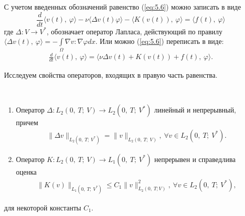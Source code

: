 С учетом введенных обозначений равенство (\ref{eq:5.6}) можно записать в виде
$$\frac{d}{dt} \langle v(t), \ \varphi \rangle - \nu\langle \Delta v(t) \varphi \rangle -
\langle K(v(t)), \ \varphi \rangle = \langle f(t), \ \varphi \rangle $$
где $\Delta: V \rightarrow V^\ast$, обозначает оператор Лапласа, действующий по правилу
$\langle \Delta v(t), \ \varphi \rangle=-\int\limits_\Omega \nabla v:\nabla\varphi dx.$
Или можно (\ref{eq:5.6}) переписать в виде:
\begin{equation}\label{eq:5.8}
    \begin{gathered}
        \frac{d}{dt} \langle v(t), \ \varphi \rangle = \langle \nu\Delta v(t)+K(v(t))+f(t), \ \varphi \rangle.
    \end{gathered}
\end{equation}

Исследуем свойства операторов, входящих в правую часть равенства.
\begin{lemma} ~\\
    \begin{enumerate}
        \item Оператор \linebreak $\Delta: L_2(0, \ T; \ V) \rightarrow L_2(0, \ T; \ V^\ast)$ линейный и непрерывный, причем
        \begin{equation}\label{eq:5.9}
            \begin{gathered}
                \parallel \Delta v \parallel_{L_2(0, \ T; \ V^\ast)} = \parallel v \parallel_{L_2(0, \ T; \ V)}, \ \forall v \in L_2(0, \ T; \ V^\ast).
            \end{gathered}
        \end{equation}
        \item Оператор $K: L_2(0, \ T; \ V) \rightarrow L_1(0, \ T; \ V^\ast)$ непрерывен и справедлива оценка
        \begin{equation}\label{eq:5.10}
            \begin{gathered}
                \parallel K(v) \parallel_{L_1(0, \ T; \ V^\ast)} \leqslant C_1\parallel v \parallel^2_{L_2(0, \ T;V)}, \ \forall v \in L_2(0, \ T; \ V^\ast),
            \end{gathered}
        \end{equation}
    \end{enumerate}
    для некоторой константы $C_1$.
\end{lemma}

